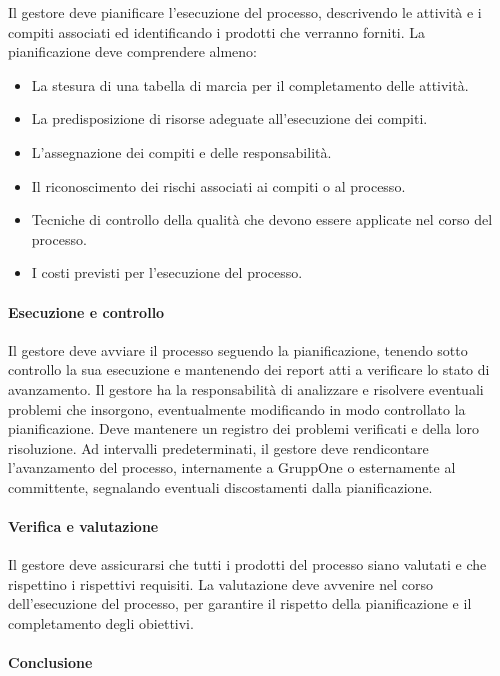 \documentclass[../../norme-di-progetto.tex]{subfiles}
\begin{document}
Il gestore deve pianificare l'esecuzione del processo, descrivendo le attività e i compiti associati ed identificando i prodotti che verranno forniti.
La pianificazione deve comprendere almeno:
\begin{itemize}
  \item La stesura di una tabella di marcia per il completamento delle attività.
  \item La predisposizione di risorse adeguate all'esecuzione dei compiti.
  \item L'assegnazione dei compiti e delle responsabilità.
  \item Il riconoscimento dei rischi associati ai compiti o al processo.
  \item Tecniche di controllo della qualità che devono essere applicate nel corso del processo.
  \item I costi previsti per l'esecuzione del processo.
\end{itemize}

\paragraph{Esecuzione e controllo}%
\label{par:esecuzione_e_controllo}

Il gestore deve avviare il processo seguendo la pianificazione, tenendo sotto controllo la sua esecuzione e mantenendo dei report atti a verificare lo stato di avanzamento.
Il gestore ha la responsabilità di analizzare e risolvere eventuali problemi che insorgono, eventualmente modificando in modo controllato la pianificazione.
Deve mantenere un registro dei problemi verificati e della loro risoluzione.
Ad intervalli predeterminati, il gestore deve rendicontare l'avanzamento del processo, internamente a GruppOne o esternamente al committente, segnalando eventuali discostamenti dalla pianificazione.

\paragraph{Verifica e valutazione}%
\label{par:verifica_e_valutazione}

Il gestore deve assicurarsi che tutti i prodotti del processo siano valutati e che rispettino i rispettivi requisiti.
La valutazione deve avvenire nel corso dell'esecuzione del processo, per garantire il rispetto della pianificazione e il completamento degli obiettivi.

\paragraph{Conclusione}%
\label{par:conclusione}
\end{document}
